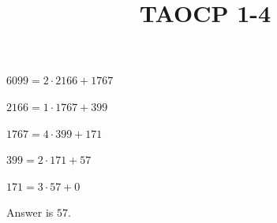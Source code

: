 \documentclass{article}
\title{TAOCP 1\mbox{-}4}
\begin{document}
\maketitle

\( 6099 = 2 \cdot 2166 + 1767 \)

\( 2166 = 1 \cdot 1767 + 399 \)

\( 1767 = 4 \cdot 399 + 171 \)

\( 399 = 2 \cdot 171 + 57 \)

\( 171 = 3 \cdot 57 + 0 \)

Answer is \( 57 \).
\end{document}
